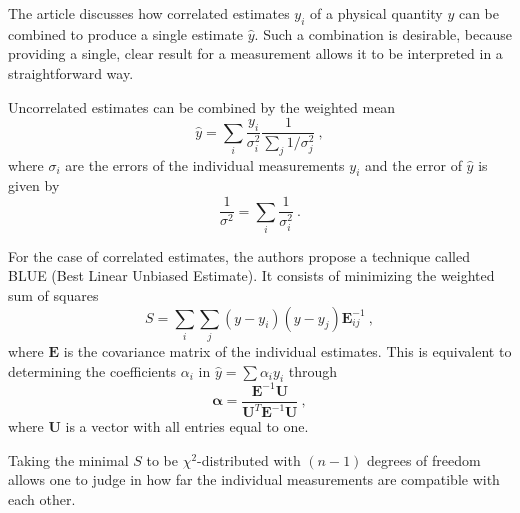 

The article\cite{lyons} discusses how correlated estimates $y_i$ of a physical quantity $y$ can be combined to produce a single estimate $\hat{y}$.
Such a combination is desirable, because providing a single, clear result for a measurement allows it to be interpreted in a straightforward way.

Uncorrelated estimates can be combined by the weighted mean
\begin{equation}
  \hat{y} = \sum_i{\frac{y_i}{\sigma_i^2}} \frac{1}{\sum_j 1/\sigma_j^2}\:,
\end{equation}
where $σ_i$ are the errors of the individual measurements $y_i$ and the error of $\hat{y}$ is given by
\begin{equation}
  \frac{1}{σ^2} = \sum_i \frac{1}{σ_i^2}\:.
\end{equation}

For the case of correlated estimates, the authors propose a technique called BLUE (Best Linear Unbiased Estimate).
It consists of minimizing the weighted sum of squares
\begin{equation}
  S = \sum_i \sum_j (y - y_i) (y - y_j) \mathbf{E}^{-1}_{ij}\:,
  \label{squares}
\end{equation}
where $\mathbf{E}$ is the covariance matrix of the individual estimates.
This is equivalent to determining the coefficients $α_i$ in $\hat{y} = \sum \alpha_i y_i$ through
\begin{equation}
  \mathbf{\alpha} = \frac{\mathbf{E}^{-1} \mathbf{U}}{\mathbf{U}^T \mathbf{E}^{-1} \mathbf{U}}\:,
\end{equation}
where $\mathbf{U}$ is a vector with all entries equal to one.

Taking the minimal $S$ to be $\chi^2$-distributed with $(n - 1)$ degrees of freedom allows one to judge in how far the individual measurements are compatible with each other.

